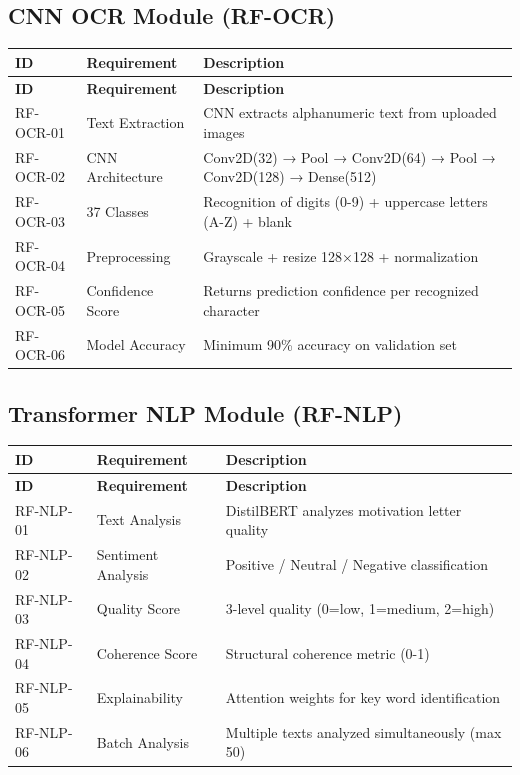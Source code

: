 \documentclass[12pt,a4paper]{report}
\begin{document}
\subsection{CNN OCR Module (RF-OCR)}
\begin{longtable}{|p{2.5cm}|p{3.5cm}|p{7cm}|}
\hline
\textbf{ID} & \textbf{Requirement} & \textbf{Description} \\
\hline
\endfirsthead
\hline \textbf{ID} & \textbf{Requirement} & \textbf{Description} \\ \hline \endhead
RF-OCR-01 & Text Extraction & CNN extracts alphanumeric text from uploaded images \\
\hline
RF-OCR-02 & CNN Architecture & Conv2D(32) → Pool → Conv2D(64) → Pool → Conv2D(128) → Dense(512) \\
\hline
RF-OCR-03 & 37 Classes & Recognition of digits (0-9) + uppercase letters (A-Z) + blank \\
\hline
RF-OCR-04 & Preprocessing & Grayscale + resize 128×128 + normalization \\
\hline
RF-OCR-05 & Confidence Score & Returns prediction confidence per recognized character \\
\hline
RF-OCR-06 & Model Accuracy & Minimum 90\% accuracy on validation set \\
\hline
\end{longtable}

\subsection{Transformer NLP Module (RF-NLP)}
\begin{longtable}{|p{2.5cm}|p{3.5cm}|p{7cm}|}
\hline
\textbf{ID} & \textbf{Requirement} & \textbf{Description} \\
\hline
\endfirsthead
\hline \textbf{ID} & \textbf{Requirement} & \textbf{Description} \\ \hline \endhead
RF-NLP-01 & Text Analysis & DistilBERT analyzes motivation letter quality \\
\hline
RF-NLP-02 & Sentiment Analysis & Positive / Neutral / Negative classification \\
\hline
RF-NLP-03 & Quality Score & 3-level quality (0=low, 1=medium, 2=high) \\
\hline
RF-NLP-04 & Coherence Score & Structural coherence metric (0-1) \\
\hline
RF-NLP-05 & Explainability & Attention weights for key word identification \\
\hline
RF-NLP-06 & Batch Analysis & Multiple texts analyzed simultaneously (max 50) \\
\hline
\end{longtable}
\end{document}
